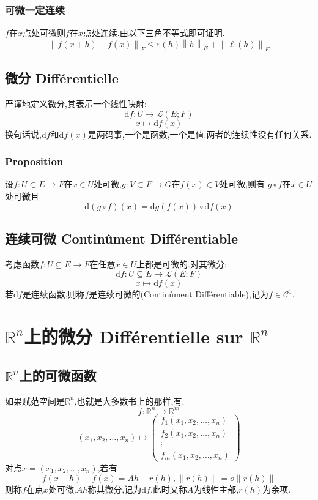 \documentclass[12pt, a4paper, oneside]{ctexbook}
\newcommand{\di }{\text{d}}%
\newcommand{\R }{\mathbb{R}}%
\newcommand{\C }{\mathcal{C}}%
\begin{document}
    \subsubsection{可微一定连续}
    $f$在$x$点处可微则$f$在$x$点处连续.由以下三角不等式即可证明.
    $$
    \left\lVert f(x+h)-f(x)\right\rVert _F\leq \varepsilon(h)\left\lVert h \right\rVert _E+\left\lVert \ell(h) \right\rVert _F
    $$
\subsection{微分 Différentielle}
    严谨地定义微分,其表示一个线性映射:
    $$
      \di f:U\rightarrow \mathcal{L}(E;F)
    $$
    $$
      x\mapsto \di f(x)
    $$
    换句话说,$\di f$和$\di f(x)$是两码事,一个是函数,一个是值.两者的连续性没有任何关系.
    \subsubsection{Proposition}
    设$f:U\subset E\rightarrow F$在$x\in U$处可微,$g:V\subset F\rightarrow G$在$f(x)\in V$处可微,则有
    $g\circ f$在$x\in U$处可微且
    $$
    \di (g\circ f)(x)=\di g(f(x))\circ \di f(x)
    $$
\subsection{连续可微 Continûment Différentiable}
    考虑函数$f:U\subseteq E\rightarrow F$在任意$x\in U$上都是可微的.对其微分:
    $$
      \di f:U\subseteq E\rightarrow \mathcal{L} (E:F)
    $$
    $$
      x\mapsto \di f(x)
    $$
    若$\di f$是连续函数,则称$f$是连续可微的(Continûment Différentiable),记为$f\in\C^1$.



\section{$\R^n$上的微分 Différentielle sur $\R^n$}
\subsection{$\R^n$上的可微函数 }
    如果赋范空间是$\R^n$,也就是大多数书上的那样,有:
    $$
      f:\R^n\rightarrow \R^m
    $$
    $$
    (x_1,x_2,\dots,x_n)\mapsto 
    \begin{pmatrix}
      f_1(x_1,x_2,\dots,x_n)\\
      f_2(x_1,x_2,\dots,x_n)\\
      \vdots\\
     f_m(x_1,x_2,\dots,x_n)
     \end{pmatrix}
    $$
    对点$x=(x_1,x_2,\dots,x_n)$,若有
    $$
    f(x+h)-f(x)=Ah+r(h),\left\lVert r(h) \right\rVert =o\left\lVert r(h) \right\rVert 
    $$
    则称$f$在点$x$处可微.$Ah$称其微分,记为$\di f$.此时又称$A$为线性主部,$r(h)$为余项.
\end{document}

